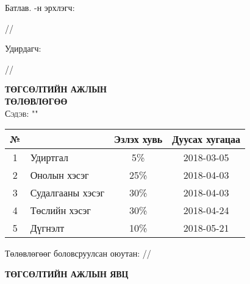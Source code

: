 
\begin{titlepage}

\vspace*{0.5cm}
Батлав. \deptname -н эрхлэгч: 
\begin{flushright}
\makebox[4cm]{\dotfill} /\chairname/ 
\end{flushright}

Удирдагч: 
\begin{flushright}
\makebox[4cm]{\dotfill} /\supname/
\end{flushright}

\begin{center}

\vspace*{2cm}
\textbf{{\large ТӨГСӨЛТИЙН АЖЛЫН \\ ТӨЛӨВЛӨГӨӨ}}\\[0.5cm]

\textsc{\large Сэдэв: "\ttitle"}\\[0.5cm]

\begin{tabular}{|c|p{7cm}|c|c|}
	\hline
	№ & \makebox[7cm][c]{Ажлын бүлэг, хэсгийн нэр} & Эзлэх хувь & Дуусах хугацаа \\ \hline
	1 & {Удиртгал}         &  5\% & 2018-03-05 \\ \hline
	2 & {Онолын хэсэг}     & 25\% & 2018-04-03 \\ \hline
	3 & {Судалгааны хэсэг} & 30\% & 2018-04-03 \\ \hline
	4 & {Төслийн хэсэг}    & 30\% & 2018-04-24 \\ \hline
	5 & {Дүгнэлт}          & 10\% & 2018-05-21 \\ \hline
\end{tabular}

\vspace{2cm}
Төлөвлөгөөг боловсруулсан оюутан: \makebox[3cm]{\dotfill} /\shortname/

\end{center}

\newpage

\begin{center}

\vspace*{2cm}
\textbf{{\large ТӨГСӨЛТИЙН АЖЛЫН ЯВЦ}}\\[0.5cm]


\end{center}
\end{titlepage}
